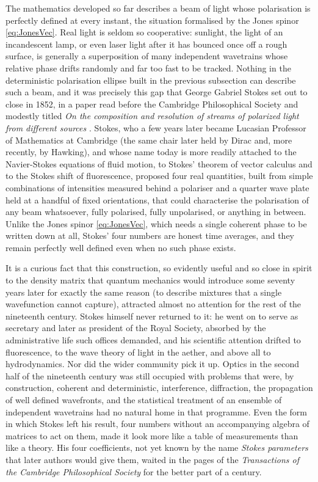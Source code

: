         The mathematics developed so far describes a beam of light whose polarisation is perfectly defined at every instant, the situation formalised by the Jones spinor \ref{eq:JonesVec}. Real light is seldom so cooperative: sunlight, the light of an incandescent lamp, or even laser light after it has bounced once off a rough surface, is generally a superposition of many independent wavetrains whose relative phase drifts randomly and far too fast to be tracked. Nothing in the deterministic polarisation ellipse built in the previous subsection can describe such a beam, and it was precisely this gap that George Gabriel Stokes set out to close in 1852, in a paper read before the Cambridge Philosophical Society and modestly titled \textit{On the composition and resolution of streams of polarized light from different sources} \citep{stokes1852composition}. Stokes, who a few years later became Lucasian Professor of Mathematics at Cambridge (the same chair later held by Dirac and, more recently, by Hawking), and whose name today is more readily attached to the Navier-Stokes equations of fluid motion, to Stokes' theorem of vector calculus and to the Stokes shift of fluorescence, proposed four real quantities, built from simple combinations of intensities measured behind a polariser and a quarter wave plate held at a handful of fixed orientations, that could characterise the polarisation of any beam whatsoever, fully polarised, fully unpolarised, or anything in between. Unlike the Jones spinor \ref{eq:JonesVec}, which needs a single coherent phase to be written down at all, Stokes' four numbers are honest time averages, and they remain perfectly well defined even when no such phase exists.

        It is a curious fact that this construction, so evidently useful and so close in spirit to the density matrix that quantum mechanics would introduce some seventy years later for exactly the same reason (to describe mixtures that a single wavefunction cannot capture), attracted almost no attention for the rest of the nineteenth century. Stokes himself never returned to it: he went on to serve as secretary and later as president of the Royal Society, absorbed by the administrative life such offices demanded, and his scientific attention drifted to fluorescence, to the wave theory of light in the aether, and above all to hydrodynamics. Nor did the wider community pick it up. Optics in the second half of the nineteenth century was still occupied with problems that were, by construction, coherent and deterministic, interference, diffraction, the propagation of well defined wavefronts, and the statistical treatment of an ensemble of independent wavetrains had no natural home in that programme. Even the form in which Stokes left his result, four numbers without an accompanying algebra of matrices to act on them, made it look more like a table of measurements than like a theory. His four coefficients, not yet known by the name \textit{Stokes parameters} that later authors would give them, waited in the pages of the \textit{Transactions of the Cambridge Philosophical Society} for the better part of a century.

